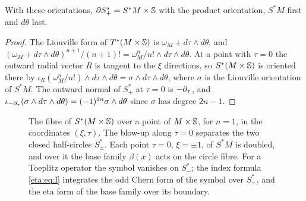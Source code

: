 \begin{lemma}\label{eta:lem:orientation}
With these orientations, $\partial S^*_+=S^*M\times\mathbb{S}$ with the product orientation,
$S^*M$ first and $d\theta$ last.
\end{lemma}

\begin{proof} The Liouville form of $T^*(M\times\mathbb{S})$ is $\omega_M+d\tau\wedge d\theta$,
and $(\omega_M+d\tau\wedge d\theta)^{n+1}/(n+1)!=\omega_M^n/n!\wedge d\tau\wedge d\theta$.
At a point with $\tau=0$ the outward radial vector $R$ is tangent to the $\xi$
directions, so $S^*(M\times\mathbb{S})$ is oriented there by
$\iota_R(\omega_M^n/n!)\wedge d\tau\wedge d\theta=\sigma\wedge d\tau\wedge d\theta$, where
$\sigma$ is the Liouville orientation of $S^*M$. The outward normal of $S^*_+$ at
$\tau=0$ is $-\partial_\tau$, and $\iota_{-\partial_\tau}(\sigma\wedge d\tau\wedge d\theta)=
(-1)^{2n}\sigma\wedge d\theta$ since $\sigma$ has degree $2n-1$.
\end{proof}

\begin{figure}[ht]
\centering
{}
\caption[Where the two terms of the index formula live]{The fibre of
$S^*(M\times\mathbb{S})$ over a point of $M\times\mathbb{S}$, for $n=1$, in the
coordinates $(\xi,\tau)$. The blow-up along $\tau=0$ separates the two closed
half-circles $S^*_\pm$. Each point $\tau=0$, $\xi=\pm1$, of $S^*M$ is doubled, and
over it the base family $\beta(x)$ acts on the circle fibre. For a Toeplitz operator
the symbol vanishes on $S^*_-$; the index formula \eqref{eta:eq:I} integrates the odd
Chern form of the symbol over $S^*_+$, and the eta form of the base family over its
boundary.}
\label{eta:fig:halfsphere}
\end{figure}

